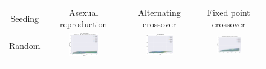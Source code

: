 \documentclass{article}
\begin{document}
\begin{landscape}
\begin{figure}[t]
\begin{center}
\begin{tabular}{c c c c}
    Seeding & Asexual reproduction & Alternating crossover & Fixed point crossover \\
    Random & \includegraphics[align=c,width=0.42\textwidth]{rc/e2/1} & \includegraphics[align=c,width=0.42\textwidth]{rc/e2/2} & \includegraphics[align=c,width=0.42\textwidth]{rc/e2/3} \\
    & & & \\

\end{tabular}
\end{center}
\end{figure}
\end{landscape}
\end{document}
